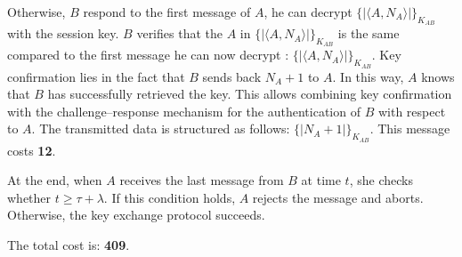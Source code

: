 Otherwise, $B$ respond to the first message of $A$, he can decrypt $\{| \langle A, N_A \rangle |\}_{K_{AB}}$ with the session key.
$B$ verifies that the $A$ in $\{| \langle A, N_A \rangle |\}_{K_{AB}}$ is the same compared to the first message he can now decrypt : $\{| \langle A,N_A \rangle |\}_{K_{AB}}$.
Key confirmation lies in the fact that $B$ sends back $N_A + 1$ to $A$. In this way, $A$ knows that $B$ has successfully
retrieved the key. This allows combining key confirmation with the challenge–response mechanism for the authentication
of $B$ with respect to $A$. The transmitted data is structured as follows: $\{| N_A + 1|\}_{K_{AB}}$.
This message costs \textbf{12}.

\vspace{1cm}


At the end, when $A$ receives the last message from $B$ at time $t$, she checks whether $t \geq \tau + \lambda$. If
this condition holds, $A$ rejects the message and aborts. Otherwise, the key exchange protocol succeeds.
\vspace{1cm}

The total cost is: \textbf{409}.
